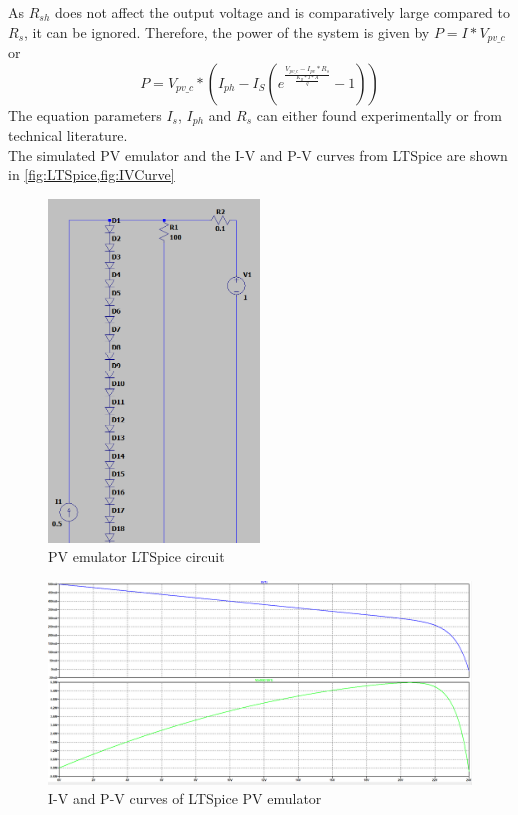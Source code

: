 \documentclass[]{article}
\begin{document}
				As $R_{sh}$ does not affect the output voltage and is comparatively large compared to $R_s$, it can be ignored. Therefore, the power of the system is given by $P=I*V_{pv\_c}$ or
				\begin{equation}
					P=V_{pv\_c}*(I_{ph}-I_S(e^\frac{V_{pv\_c}-I_{pv}*R_s}{\frac{K_B*T*A}{q}}-1))
				\end{equation}
				The equation parameters $I_s$, $I_{ph}$ and $R_s$ can either found experimentally or from technical literature.
				\\
				The simulated PV emulator and the I-V and P-V curves from LTSpice are shown in \cref{fig:LTSpice,fig:IVCurve}
				\begin{figure}[H]
					\centering
					\includegraphics[width=0.5\textwidth]{Prework_images/LTSpice_cropped}
					\caption{PV emulator LTSpice circuit}
					\label{fig:LTSpice}
				\end{figure}
			 	\begin{figure}[H]
			 		\centering
					\includegraphics[width=\textwidth]{Prework_images/IVCurve}
					\caption{I-V and P-V curves of LTSpice PV emulator}
					\label{fig:IVCurve}
				\end{figure}
\end{document}

